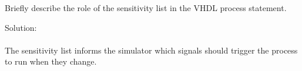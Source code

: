 Briefly describe the role of the sensitivity list in the VHDL process statement.

Solution: \\ \\
The sensitivity list informs the simulator which signals should trigger the process to run when they change.
